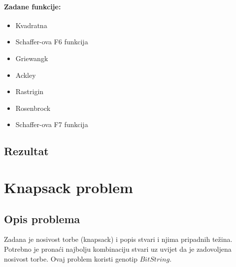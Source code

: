 \documentclass[times, utf8, zavrsni]{fer}
\begin{document}
\paragraph{Zadane funkcije:}
\begin{itemize}
\item Kvadratna
\item Schaffer-ova F6 funkcija
\item Griewangk
\item Ackley
\item Rastrigin
\item Rosenbrock
\item Schaffer-ova F7 funkcija
\end{itemize}

\subsection{Rezultat}

\section{Knapsack problem}
\subsection{Opis problema}
Zadana je nosivost torbe (knapsack) i popis stvari i njima pripadnih težina.
Potrebno je pronaći najbolju kombinaciju stvari uz uvijet da je zadovoljena nosivost torbe.
Ovaj problem koristi genotip $BitString$.
\end{document}

